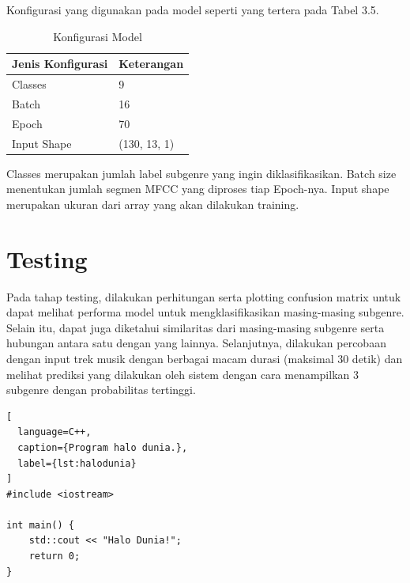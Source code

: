 Konfigurasi yang digunakan pada model seperti yang tertera pada Tabel 3.5.

\begin{table}[h]
	
	\centering
	
	\caption{Konfigurasi Model}
	
	\begin{tabular}{|l|l|}
		\hline
		\textbf{Jenis Konfigurasi} & \textbf{Keterangan} \\ \hline
		Classes                    & 9                   \\ \hline
		Batch                      & 16                  \\ \hline
		Epoch                      & 70                  \\ \hline
		Input Shape                & (130, 13, 1)        \\ \hline
	\end{tabular}

	\label{fig:konfigurasimodel}
\end{table}

Classes merupakan jumlah label subgenre yang ingin diklasifikasikan. Batch size menentukan jumlah segmen MFCC yang diproses tiap Epoch-nya. Input shape merupakan ukuran dari array yang akan dilakukan training.

\section{Testing}
\label{sec:testing}

Pada tahap testing, dilakukan perhitungan serta plotting confusion matrix untuk dapat melihat performa model untuk mengklasifikasikan masing-masing subgenre. Selain itu, dapat juga diketahui similaritas dari masing-masing subgenre serta hubungan antara satu dengan yang lainnya. Selanjutnya, dilakukan percobaan dengan input trek musik dengan berbagai macam durasi (maksimal 30 detik) dan melihat prediksi yang dilakukan oleh sistem dengan cara menampilkan 3 subgenre dengan probabilitas tertinggi.


\begin{lstlisting}[
  language=C++,
  caption={Program halo dunia.},
  label={lst:halodunia}
]
#include <iostream>

int main() {
    std::cout << "Halo Dunia!";
    return 0;
}
\end{lstlisting}

\lipsum[2-3]



\lipsum[4]

